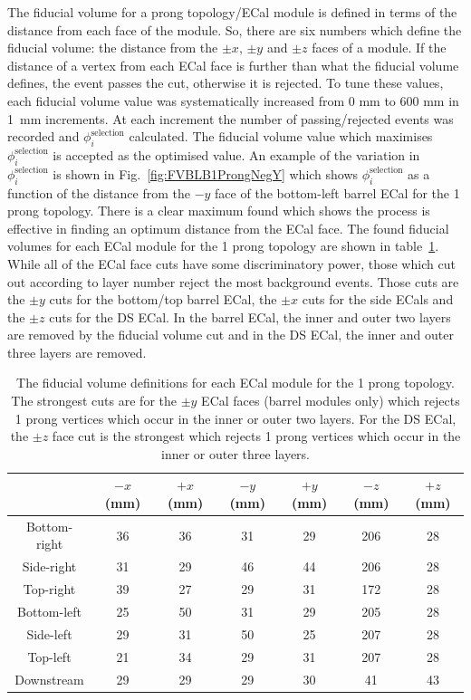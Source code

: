 The fiducial volume for a prong topology/ECal module is defined in terms of the distance from each face of the module.  So, there are six numbers which define the fiducial volume:  the distance from the $\pm x$, $\pm y$ and $\pm z$ faces of a module.  If the distance of a vertex from each ECal face is further than what the fiducial volume defines, the event passes the cut, otherwise it is rejected.  To tune these values,  each fiducial volume value was systematically increased from 0 mm to 600 mm in 1~mm increments.  At each increment the number of passing/rejected events was recorded and $\phi_i^{\textrm{selection}}$ calculated.  The fiducial volume value which maximises $\phi_i^{\textrm{selection}}$ is accepted as the optimised value.  An example of the variation in $\phi_i^{\textrm{selection}}$ is shown in Fig.~\ref{fig:FVBLB1ProngNegY} which shows $\phi_i^{\textrm{selection}}$ as a function of the distance from the $-y$ face of the bottom-left barrel ECal for the 1 prong topology.  There is a clear maximum found which shows the process is effective in finding an optimum distance from the ECal face.
\newline
\newline
The found fiducial volumes for each ECal module for the 1 prong topology are shown in table~\ref{table:FV1Prong}.  While all of the ECal face cuts have some discriminatory power, those which cut out according to layer number reject the most background events.  Those cuts are the $\pm y$ cuts for the bottom/top barrel ECal, the $\pm x$ cuts for the side ECals and the $\pm z$ cuts for the DS ECal.  In the barrel ECal, the inner and outer two layers are removed by the fiducial volume cut and in the DS ECal, the inner and outer three layers are removed.
\begin{table}[t!]
  \begin{tabular}{ c c c c c c c }
     & $-x$ (mm) & $+x$ (mm) & $-y$ (mm) & $+y$ (mm) & $-z$ (mm) & $+z$ (mm)  \\ \hline \hline
    Bottom-right & 36 & 36 & 31 & 29 & 206 & 28 \\
    Side-right & 31 & 29 & 46 & 44 & 206 & 28 \\
    Top-right & 39 & 27 & 29 & 31 & 172 & 28 \\
    Bottom-left & 25 & 50 & 31 & 29 & 205 & 28 \\
    Side-left & 29 & 31 & 50 & 25 & 207 & 28 \\
    Top-left & 21 & 34 & 29 & 31 & 207 & 28 \\
    Downstream & 29 & 29 & 29 & 30 & 41 & 43  \\
  \end{tabular}
  \caption{The fiducial volume definitions for each ECal module for the 1 prong topology.  The strongest cuts are for the $\pm y$ ECal faces (barrel modules only) which rejects 1 prong vertices which occur in the inner or outer two layers.  For the DS ECal, the $\pm z$ face cut is the strongest which rejects 1 prong vertices which occur in the inner or outer three layers.}
  \label{table:FV1Prong}
\end{table}
